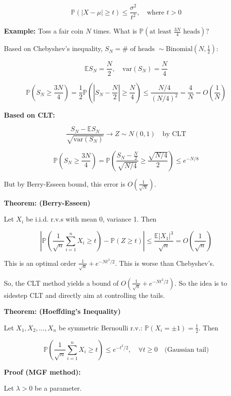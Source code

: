 \documentclass[12pt]{article}
\begin{document}
\[ \mathbb{P}(|X - \mu| \geq t) \leq \frac{\sigma^2}{t^2}, \quad \text{where } t > 0 \]

\textbf{Example:} Toss a fair coin \( N \) times. What is \( \mathbb{P}(\text{at least } \frac{3N}{4} \text{ heads}) \)?

Based on Chebyshev's inequality, \( S_N = \# \text{ of heads } \sim \text{Binomial}(N, \frac{1}{2}) \):

\[ \mathbb{E}S_N = \frac{N}{2}, \quad \text{var}(S_N) = \frac{N}{4} \]

\[ \mathbb{P}\left(S_N \geq \frac{3N}{4}\right) = \frac{1}{2} \mathbb{P}\left(|S_N - \frac{N}{2}| \geq \frac{N}{4}\right) \leq \frac{N/4}{(N/4)^2} = \frac{4}{N} = O\left(\frac{1}{N}\right) \]

\textbf{Based on CLT:}

\[ \frac{S_N - \mathbb{E}S_N}{\sqrt{\text{var}(S_N)}} \to Z \sim N(0,1) \quad \text{by CLT} \]

\[ \mathbb{P}\left(S_N \geq \frac{3N}{4}\right) = \mathbb{P}\left(\frac{S_N - \frac{N}{2}}{\sqrt{N/4}} \geq \frac{\sqrt{N/4}}{2}\right) \leq e^{-N/8} \]

But by Berry-Esseen bound, this error is \( O\left(\frac{1}{\sqrt{N}}\right) \).


\textbf{Theorem: (Berry-Esseen)}

Let \( X_i \) be i.i.d. r.v.s with mean 0, variance 1. Then

\[
\left| \mathbb{P}\left(\frac{1}{\sqrt{n}}\sum_{i=1}^{n} X_i \geq t\right) - \mathbb{P}(Z \geq t) \right| \leq \frac{\mathbb{E}|X_1|^3}{\sqrt{n}} = O\left(\frac{1}{\sqrt{n}}\right)
\]

This is an optimal order \( \frac{1}{\sqrt{n}} + e^{-Nt^2/2} \). This is worse than Chebyshev's.

So, the CLT method yields a bound of \( O\left(\frac{1}{\sqrt{n}} + e^{-Nt^2/2}\right) \). So the idea is to sidestep CLT and directly aim at controlling the tails.

\textbf{Theorem: (Hoeffding's Inequality)}

Let \( X_1, X_2, \dots, X_n \) be symmetric Bernoulli r.v.: \( \mathbb{P}(X_i = \pm 1) = \frac{1}{2} \). Then

\[
\mathbb{P}\left(\frac{1}{\sqrt{n}} \sum_{i=1}^{n} X_i \geq t\right) \leq e^{-t^2/2}, \quad \forall t \geq 0 \quad \text{(Gaussian tail)}
\]

\textbf{Proof (MGF method):}

Let \( \lambda > 0 \) be a parameter.
\end{document}

